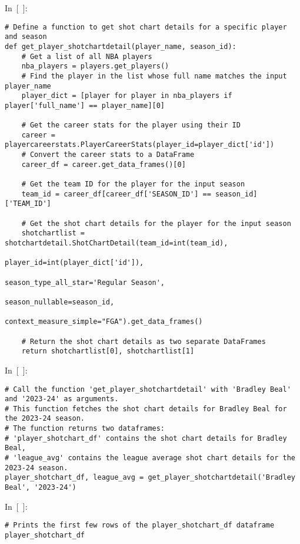 In~{[}~{]}:

\begin{verbatim}
# Define a function to get shot chart details for a specific player and season
def get_player_shotchartdetail(player_name, season_id):
    # Get a list of all NBA players
    nba_players = players.get_players()
    # Find the player in the list whose full name matches the input player_name
    player_dict = [player for player in nba_players if player['full_name'] == player_name][0]
    
    # Get the career stats for the player using their ID
    career = playercareerstats.PlayerCareerStats(player_id=player_dict['id'])
    # Convert the career stats to a DataFrame
    career_df = career.get_data_frames()[0]
    
    # Get the team ID for the player for the input season
    team_id = career_df[career_df['SEASON_ID'] == season_id]['TEAM_ID']
    
    # Get the shot chart details for the player for the input season
    shotchartlist = shotchartdetail.ShotChartDetail(team_id=int(team_id), 
                                                   player_id=int(player_dict['id']), 
                                                   season_type_all_star='Regular Season', 
                                                   season_nullable=season_id,
                                                   context_measure_simple="FGA").get_data_frames()
    
    # Return the shot chart details as two separate DataFrames
    return shotchartlist[0], shotchartlist[1]
\end{verbatim}

In~{[}~{]}:

\begin{verbatim}
# Call the function 'get_player_shotchartdetail' with 'Bradley Beal' and '2023-24' as arguments.
# This function fetches the shot chart details for Bradley Beal for the 2023-24 season.
# The function returns two dataframes: 
# 'player_shotchart_df' contains the shot chart details for Bradley Beal,
# 'league_avg' contains the league average shot chart details for the 2023-24 season.
player_shotchart_df, league_avg = get_player_shotchartdetail('Bradley Beal', '2023-24')
\end{verbatim}

In~{[}~{]}:

\begin{verbatim}
# Prints the first few rows of the player_shotchart_df dataframe
player_shotchart_df
\end{verbatim}

